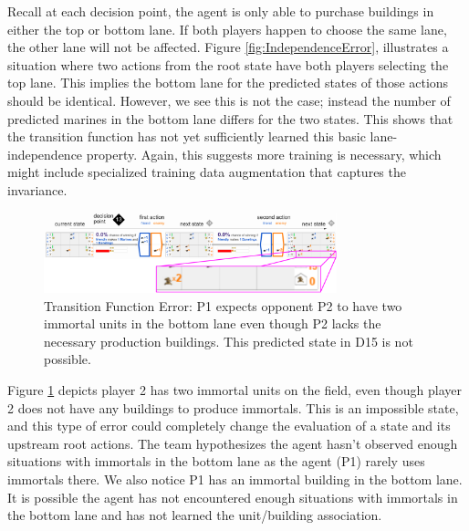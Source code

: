 \documentclass{article}
\begin{document}
Recall at each decision point, the agent is only able to purchase buildings in either the top or bottom lane. If both players happen to choose the same lane, the other lane will not be affected. Figure \ref{fig:IndependenceError}, illustrates a situation where two actions from the root state have both players selecting the top lane. This implies the bottom lane for the predicted states of those actions should be identical. However, we see this is not the case; instead the number of predicted marines in the bottom lane differs for the two states. This shows that the transition function has not yet sufficiently learned this basic lane-independence property. Again, this suggests more training is necessary, which might include specialized training data augmentation that captures the invariance. 


\begin{figure}[t]
    \centering
    \includegraphics[width=8.5cm]{img/bugs/unitsNoBuildings.PNG}
    \caption{Transition Function Error: P1 expects opponent P2 to have two immortal units in the bottom lane even though P2 lacks the necessary production buildings. This predicted state in D15 is not possible.}
    \label{fig:unitsNoBUildings}
\end{figure}

Figure \ref{fig:unitsNoBUildings} depicts player 2 has two immortal units on the field, even though player 2 does not have any buildings to produce immortals. This is an impossible state, and this type of error could completely change the evaluation of a state and its upstream root actions. The team hypothesizes the agent hasn't observed enough situations with immortals in the bottom lane as the agent (P1) rarely uses immortals there. We also notice P1 has an immortal building in the bottom lane. It is possible the agent has not encountered enough situations with immortals in the bottom lane and has not learned the unit/building association. 
\end{document}
